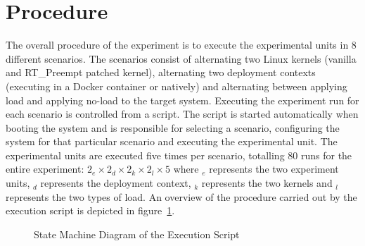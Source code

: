 \section{Procedure}%
The overall procedure of the experiment is to execute the experimental units in 8 different scenarios. The scenarios consist of alternating two Linux kernels (vanilla and RT\_Preempt patched kernel), alternating two deployment contexts (executing in a Docker container or natively) and alternating between applying load and applying no-load to the target system. Executing the experiment run for each scenario is controlled from a  script. The script is started automatically when booting the system and is responsible for selecting a scenario, configuring the system for that particular scenario and executing the experimental unit. The experimental units are executed five times per scenario, totalling 80 runs for the entire experiment: \(2_{e} \times 2_{d} \times{} 2_{k}  \times{} 2_{l} \times{} 5 \) where $_{e}$ represents the two experiment units, $_{d}$ represents the deployment context, $_{k}$ represents the two kernels and $_{l}$ represents the two types of load. An overview of the procedure carried out by the execution script is depicted in figure~\ref{procedure-state}.


\begin{figure}[ht]
\centering
\caption{State Machine Diagram of the Execution Script }
\label{procedure-state}
\end{figure}

	

